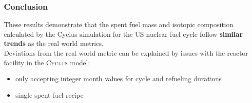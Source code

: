 \begin{frame}
  \frametitle{Conclusion}
        These results demonstrate that the spent fuel mass and isotopic
        composition calculated by the Cyclus simulation for
        the US nuclear fuel cycle follow \textbf{similar trends} as the real
        world metrics.
        \\
        
        Deviations from the real world metric can be explained by issues with 
        the reactor facility in the \textsc{Cyclus} model: 
        \begin{itemize}
                \item only accepting integer month values for
                cycle and refueling durations
                \item single spent fuel recipe 
        \end{itemize}
        
\end{frame}

